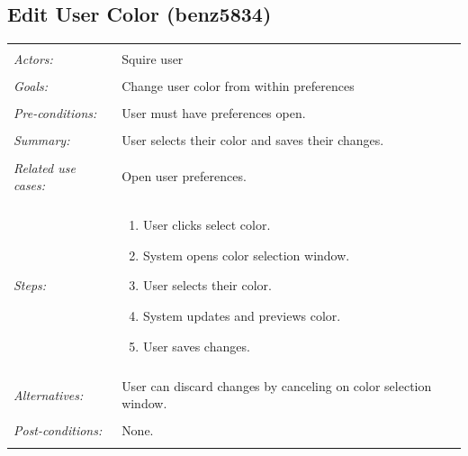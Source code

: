 \documentclass[11pt]{report}
\begin{document}
\subsection{Edit User Color (benz5834)}
\begin{tabular}{ p{2cm} p{12cm} }
 \hline
 \\
 \textit{Actors:} & Squire user \\ 
 \\
 \textit{Goals:} & Change user color from within preferences \\
 \\
 \textit{Pre-conditions:} & User must have preferences open. \\
 \\
 \textit{Summary:} & User selects their color and saves their changes.  \\ 
 \\
 \textit{Related use cases:} & Open user preferences. \\ 
 \\
 \textit{Steps:} & \begin{enumerate}
  \item User clicks select color.
  \item System opens color selection window.
  \item User selects their color.
  \item System updates and previews color.
  \item User saves changes.
 \end{enumerate} \\
 \\
 \textit{Alternatives:} & User can discard changes by canceling on color selection window. \\
 \\
 \textit{Post-conditions:} & None. \\
 \\
\hline
\end{tabular}
\end{document}
